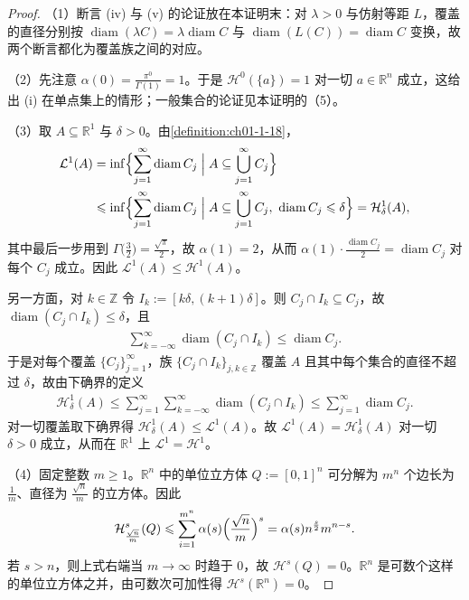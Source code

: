 \documentclass[../../main.tex]{subfiles}%
\begin{document}
\begin{proof}
（1）断言 (iv) 与 (v) 的论证放在本证明末：对 $\lambda>0$ 与仿射等距 $L$，覆盖的直径分别按 $\operatorname{diam}(\lambda C)=\lambda\operatorname{diam}C$ 与 $\operatorname{diam}(L(C))=\operatorname{diam}C$ 变换，故两个断言都化为覆盖族之间的对应。

（2）先注意 $\alpha(0)=\frac{\pi^{0}}{\Gamma(1)}=1$。于是 $\mathcal{H}^0(\{a\})=1$ 对一切 $a\in\mathbb{R}^n$ 成立，这给出 (i) 在单点集上的情形；一般集合的论证见本证明的（5）。

（3）取 $A\subseteq\mathbb{R}^1$ 与 $\delta>0$。由\cref{definition:ch01-1-18}，%
\begin{align*}
\mathcal{L}^1(A)&=\inf\Bigl\{\sum_{j=1}^{\infty}\operatorname{diam}C_j\Bigm| A\subseteq\bigcup_{j=1}^{\infty}C_j\Bigr\}\\
&\leqslant\inf\Bigl\{\sum_{j=1}^{\infty}\operatorname{diam}C_j\Bigm| A\subseteq\bigcup_{j=1}^{\infty}C_j,\ \operatorname{diam}C_j\leqslant\delta\Bigr\}=\mathcal{H}^1_\delta(A),
\end{align*}
其中最后一步用到 $\Gamma\bigl(\frac32\bigr)=\frac{\sqrt{\pi}}{2}$，故 $\alpha(1)=2$，从而 $\alpha(1)\cdot\frac{\operatorname{diam}C_j}{2}=\operatorname{diam}C_j$ 对每个 $C_j$ 成立。因此 $\mathcal{L}^1(A)\leqslant\mathcal{H}^1(A)$。

另一方面，对 $k\in\mathbb{Z}$ 令 $I_k:=[k\delta,(k+1)\delta]$。则 $C_j\cap I_k\subseteq C_j$，故 $\operatorname{diam}(C_j\cap I_k)\leqslant\delta$，且
\begin{align*}
\sum_{k=-\infty}^{\infty}\operatorname{diam}(C_j\cap I_k)\leqslant\operatorname{diam}C_j.
\end{align*}
于是对每个覆盖 $\{C_j\}_{j=1}^{\infty}$，族 $\{C_j\cap I_k\}_{j,k\in\mathbb{Z}}$ 覆盖 $A$ 且其中每个集合的直径不超过 $\delta$，故由下确界的定义
\begin{align*}
\mathcal{H}^1_\delta(A)\leqslant\sum_{j=1}^{\infty}\sum_{k=-\infty}^{\infty}\operatorname{diam}(C_j\cap I_k)\leqslant\sum_{j=1}^{\infty}\operatorname{diam}C_j.
\end{align*}
对一切覆盖取下确界得 $\mathcal{H}^1_\delta(A)\leqslant\mathcal{L}^1(A)$。故 $\mathcal{L}^1(A)=\mathcal{H}^1_\delta(A)$ 对一切 $\delta>0$ 成立，从而在 $\mathbb{R}^1$ 上 $\mathcal{L}^1=\mathcal{H}^1$。

（4）固定整数 $m\geqslant1$。$\mathbb{R}^n$ 中的单位立方体 $Q:=[0,1]^n$ 可分解为 $m^n$ 个边长为 $\frac1m$、直径为 $\frac{\sqrt{n}}{m}$ 的立方体。因此
\begin{align*}
\mathcal{H}^s_{\frac{\sqrt{n}}{m}}(Q)\leqslant\sum_{i=1}^{m^n}\alpha(s)\Bigl(\frac{\sqrt{n}}{m}\Bigr)^s=\alpha(s)n^{\frac{s}{2}}m^{n-s}.
\end{align*}
若 $s>n$，则上式右端当 $m\to\infty$ 时趋于 $0$，故 $\mathcal{H}^s(Q)=0$。$\mathbb{R}^n$ 是可数个这样的单位立方体之并，由可数次可加性得 $\mathcal{H}^s(\mathbb{R}^n)=0$。


\end{proof}
\end{document}

